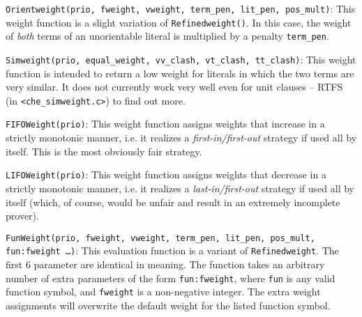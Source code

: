 \documentclass{report}
\begin{document}
\medskip
\begin{sloppypar}
\noindent{}\texttt{Orientweight(prio, fweight, vweight,
    term\_pen, lit\_pen, pos\_mult)}: This weight function is a
slight variation of \texttt{Refinedweight()}. In this case, the weight
of \emph{both} terms of an unorientable literal is multiplied by a
penalty \texttt{term\_pen}.
\end{sloppypar}

\medskip
\begin{sloppypar}
\noindent{}\texttt{Simweight(prio, equal\_weight,
  vv\_clash, vt\_clash, tt\_clash)}: This weight function is intended
to return a low weight for literals in which the two terms are very
similar. It does not currently work very well even for unit clauses --
RTFS (in \texttt{<che\_simweight.c>}) to find out more.
\end{sloppypar}

\medskip
\begin{sloppypar}
\noindent{}\texttt{FIFOWeight(prio)}:
This weight function assigns weights that increase in a strictly
monotonic manner, i.e. it realizes a \emph{first-in/first-out}
strategy if used all by itself. This is the most obviously fair
strategy.
\end{sloppypar}

\medskip
\begin{sloppypar}
\noindent{}\texttt{LIFOWeight(prio)}:
This weight function assigns weights that decrease in a strictly
monotonic manner, i.e. it realizes a \emph{last-in/first-out}
strategy if used all by itself (which, of course, would be unfair and
result in an extremely incomplete prover).
\end{sloppypar}

\medskip
\begin{sloppypar}
  \noindent{}\texttt{FunWeight(prio, fweight, vweight,
    term\_pen, lit\_pen, pos\_mult, fun:fweight \ldots)}:
  This evaluation function is a variant of \texttt{Refinedweight}. The
  first 6 parameter are identical in meaning. The function takes an
  arbitrary number of extra parameters of the form
  \texttt{fun:fweight}, where \texttt{fun} is any valid function
  symbol, and \texttt{fweight} is a non-negative integer. The extra
  weight assignments will overwrite the default weight for the listed
  function symbol.


\end{sloppypar}
\end{document}

